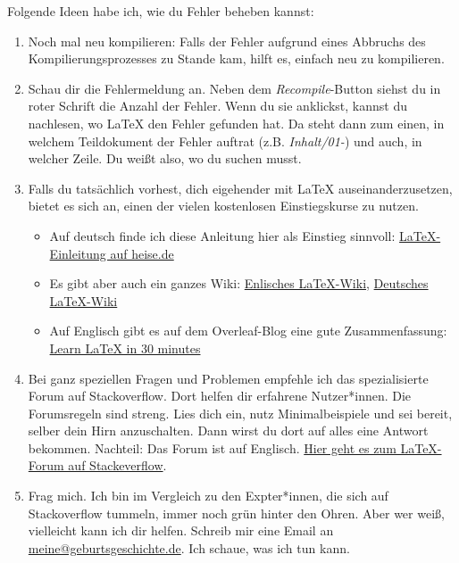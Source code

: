 Folgende Ideen habe ich, wie du Fehler beheben kannst:
\begin{enumerate}
    \item Noch mal neu kompilieren: Falls der Fehler aufgrund eines Abbruchs des Kompilierungsprozesses zu Stande kam, hilft es, einfach neu zu kompilieren.
    \item Schau dir die Fehlermeldung an. Neben dem \emph{Recompile}-Button siehst du in roter Schrift die Anzahl der Fehler. Wenn du sie anklickst, kannst du nachlesen, wo \LaTeX{} den Fehler gefunden hat. Da steht dann zum einen, in welchem Teildokument der Fehler auftrat (z.B. \textit{Inhalt/01-}) und auch, in welcher Zeile. Du weißt also, wo du suchen musst.
    \item Falls du tatsächlich vorhest, dich eigehender mit \LaTeX{} auseinanderzusetzen, bietet es sich an, einen der vielen kostenlosen Einstiegskurse zu nutzen. \begin{itemize}
        \item Auf deutsch finde ich diese Anleitung hier als Einstieg sinnvoll: \href{https://www.heise.de/download/blog/Einfuehrung-in-LaTeX-3599742}{\LaTeX-Einleitung auf heise.de}
        \item Es gibt aber auch ein ganzes Wiki: \href{https://en.wikibooks.org/wiki/LaTeX}{Enlisches \LaTeX-Wiki}, \href{https://de.wikibooks.org/wiki/LaTeX-Kompendium}{Deutsches \LaTeX-Wiki}
         \item Auf Englisch gibt es auf dem Overleaf-Blog eine gute Zusammenfassung: \href{https://www.overleaf.com/learn/latex/Learn_LaTeX_in_30_minutes}{Learn \LaTeX{} in 30 minutes}
         \end{itemize}
         \item Bei ganz speziellen Fragen und Problemen empfehle ich das spezialisierte Forum auf Stackoverflow. Dort helfen dir erfahrene Nutzer*innen. Die Forumsregeln sind streng. Lies dich ein, nutz Minimalbeispiele und sei bereit, selber dein Hirn anzuschalten. Dann wirst du dort auf alles eine Antwort bekommen. Nachteil: Das Forum ist auf Englisch. \href{https://tex.stackexchange.com/}{Hier geht es zum \LaTeX-Forum auf Stackeverflow}.
         \item Frag mich. Ich bin im Vergleich zu den Expter*innen, die sich auf Stackoverflow tummeln, immer noch grün hinter den Ohren. Aber wer weiß, vielleicht kann ich dir helfen. Schreib mir eine Email an \href{mailto:meine@geburtsgeschichte.de}{meine@geburtsgeschichte.de}. Ich schaue, was ich tun kann.
\end{enumerate}

